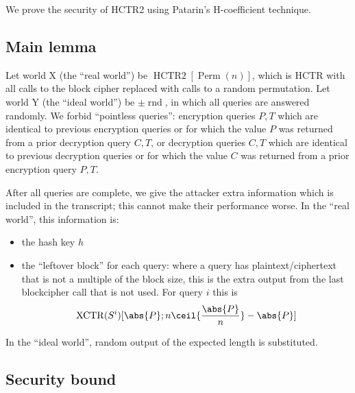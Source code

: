 \documentclass[letterpaper,11pt]{article}
\DeclareMathOperator{\HCTR}{HCTR2}
\DeclareMathOperator{\Perm}{Perm}
\DeclareMathOperator{\rnd}{rnd}
\DeclareMathOperator{\XCTR}{XCTR}
\begin{document}
We prove the security of HCTR2 using Patarin's H-coefficient technique. 

\subsection{Main lemma} 
Let world X (the ``real world'') be \(\HCTR[\Perm(n)]\),
which is HCTR with all calls to the block cipher
replaced with calls to a random permutation.
Let world Y (the ``ideal world'') be \(\pm\rnd\),
in which all queries are answered randomly.
We forbid ``pointless queries'':
encryption queries \(P, T\)
which are identical to previous encryption queries
or for which the value \(P\) was returned from a prior
decryption  query \(C, T\), or
decryption queries \(C, T\)
which are identical to previous decryption queries
or for which the value \(C\) was returned from a prior
encryption  query \(P, T\).

After all queries are complete, we give the attacker
extra information
which is included in the transcript;
this cannot make
their performance worse. In the ``real world'', 
this information is:
\begin{itemize}
    \item the hash key \(h\)
    \item the ``leftover block'' for each query:
    where a query has plaintext/ciphertext
    that is not a multiple of the block size,
    this is the extra output from the last
    blockcipher call that is not used.
    For query \(i\) this is 
    \[\XCTR(S^i)[\abs{P}; n\ceil{\frac{\abs{P}}{n}}-\abs{P}]\]
\end{itemize}
In the ``ideal world'', random output of the expected
length is substituted.

\subsection{Security bound}

\printbibliography[heading=bibintoc]
\end{document}
